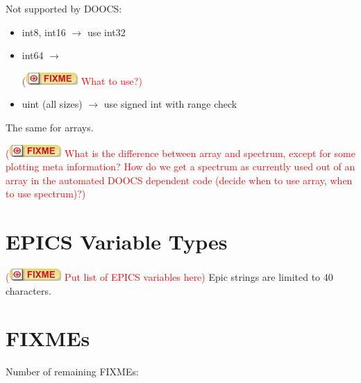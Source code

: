 \documentclass[11pt,a4paper]{scrartcl}
\newcounter{nFixmes}
\newcommand{\fixme}[1]{\addtocounter{nFixmes}{1}\textcolor{red}{(\includegraphics[height=2ex]{fixme} #1)}\xspace}
\begin{document}
Not supported by DOOCS:
\begin{itemize}
\item int8, int16 $\rightarrow$ use int32
\item int64 $\rightarrow$ \fixme{What to use?}
\item uint (all sizes) $\rightarrow$ use signed int with range check
\end{itemize}
The same for arrays.

\fixme{What is the difference between array and spectrum, except for some
  plotting meta information? How do we get a spectrum as currently used out of
  an array in the automated DOOCS dependent code (decide when to use array,
  when to use spectrum)?}

\section{EPICS Variable Types}
\fixme{Put list of EPICS variables here}
Epic strings are limited to 40 characters.

\section{FIXMEs}
Number of remaining FIXMEs: 
\end{document}
